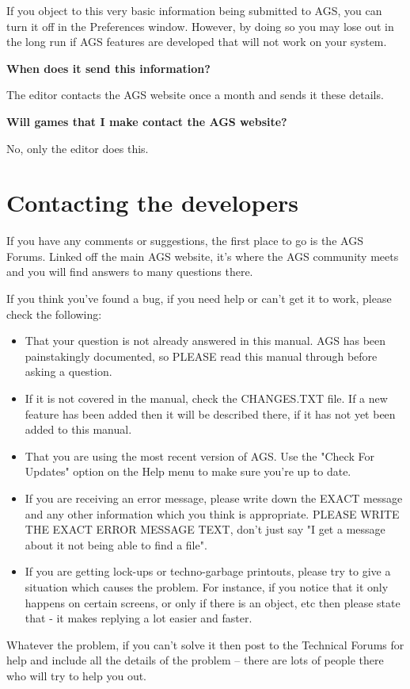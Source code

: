 If you object to this very basic information being submitted to AGS, you can
turn it off in the Preferences window. However, by doing so you may lose out in
the long run if AGS features are developed that will not work on your system.

\bf{When does it send this information?}

The editor contacts the AGS website once a month and sends it these details.

\bf{Will games that I make contact the AGS website?}

No, only the editor does this.



\chapter{Contacting the developers}%

If you have any comments or suggestions, the first place to go is the AGS
Forums. Linked off the main AGS website, it's where the AGS community
meets and you will find answers to many questions there.

If you think you've found a bug, if you need help or can't get it to work,
please check the following:\begin{itemize}
\item That your question is not already answered in this manual. AGS has been
painstakingly documented, so PLEASE read this manual through before asking a question.
\item If it is not covered in the manual, check the CHANGES.TXT file. If a new
feature has been added then it will be described there, if it has not yet
been added to this manual.
\item That you are using the most recent version of AGS. Use the "Check For
Updates" option on the Help menu to make sure you're up to date.
\item If you are receiving an error message, please write down the EXACT message
and any other information which you think is appropriate. PLEASE WRITE THE
EXACT ERROR MESSAGE TEXT, don't just say "I get a message about it not being
able to find a file".
\item If you are getting lock-ups or techno-garbage printouts, please try to
give a situation which causes the problem. For instance, if you notice that
it only happens on certain screens, or only if there is an object, etc then
please state that - it makes replying a lot easier and faster.
\end{itemize}
Whatever the problem, if you can't solve it then post to the Technical Forums
for help and include all the details of the problem -- there are lots of
people there who will try to help you out.

